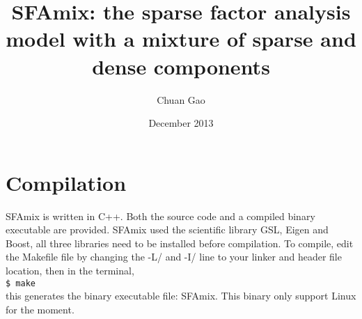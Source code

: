 \documentclass[11pt,a4paper]{article}
\title{SFAmix: the sparse factor analysis model with
a mixture of sparse and dense components}
\author{Chuan Gao}
\date{December 2013}
\begin{document}
\maketitle
\section{Compilation}
SFAmix is written in C++. Both the source code and a compiled binary
executable are provided. SFAmix used the scientific library GSL,
Eigen and Boost, all three libraries need to be installed before compilation. To
compile, edit the Makefile file by changing the -L/ and -I/ line to your
linker and header file location, then in the terminal,\\
\noindent \texttt{\$ make}\\
this generates the binary executable file: SFAmix. This binary only
support Linux for the moment.
\end{document}
